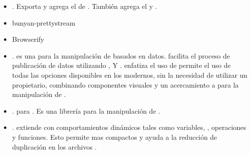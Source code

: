 \begin{itemize}
		\item
			\textbf{\bunyanPackage}. Exporta y agrega el \moduleAS de \loggingCPT \bunyanNAME. También agrega el \clientAS \browserifyNAME y \bunyanprettyStreamMETEOR.
		\item
			bunyan-prettystream
		\item
			Browserify
		\item
			\textbf{\dThreePackage}. \dddNAME es una \libraryPC	\javaScriptNAME para la manipulación de  \documentsDB basados en datos. \dThreePackage facilita el proceso de publicación de datos utilizando \htmlNAME, \svgNAME Y \cssNAME. \dThreePackage enfatiza el uso de \webStandardINT permite el uso de todas las opciones disponibles en los \browsersINT modernos, sin la necesidad de utilizar un \frameworkPC propietario, combinando componentes visuales y un acercamiento a \dataDrivenCPT para la manipulación de \htmldomNAME.
		\item
			\textbf{\undStringLatestPackage}. \undStringLatestMETEOR \packageAS para \meteorNAME. Es una librería para la manipulación de \stringsPL.
		\item
			\textbf{\lessPackage}. \lessNAME extiende \cssNAME con comportamientos dinámicos tales como variables, \mixinsNAME, operaciones y funciones. Esto permite  \stylesheetsNAME mas compactos y ayuda a la reducción de duplicación en los archivos \cssNAME. 




\end{itemize}
